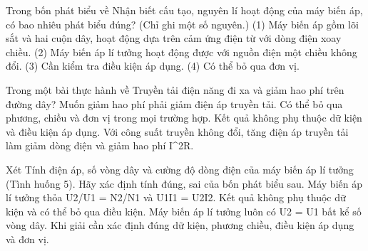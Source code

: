 \begin{ex}
Trong bốn phát biểu về Nhận biết cấu tạo, nguyên lí hoạt động của máy biến áp, có bao nhiêu phát biểu đúng? (Chỉ ghi một số nguyên.) (1) Máy biến áp gồm lõi sắt và hai cuộn dây, hoạt động dựa trên cảm ứng điện từ với dòng điện xoay chiều. (2) Máy biến áp lí tưởng hoạt động được với nguồn điện một chiều không đổi. (3) Cần kiểm tra điều kiện áp dụng. (4) Có thể bỏ qua đơn vị.
\end{ex}

\begin{ex}
Trong một bài thực hành về Truyền tải điện năng đi xa và giảm hao phí trên đường dây?
\choice
{Muốn giảm hao phí phải giảm điện áp truyền tải.}
{Có thể bỏ qua phương, chiều và đơn vị trong mọi trường hợp.}
{Kết quả không phụ thuộc dữ kiện và điều kiện áp dụng.}
{\True Với công suất truyền không đổi, tăng điện áp truyền tải làm giảm dòng điện và giảm hao phí I^2R.}
\end{ex}

\begin{ex}
Xét Tính điện áp, số vòng dây và cường độ dòng điện của máy biến áp lí tưởng (Tình huống 5). Hãy xác định tính đúng, sai của bốn phát biểu sau.
\choiceTF
{\True Máy biến áp lí tưởng thỏa U2/U1 = N2/N1 và U1I1 = U2I2.}
{Kết quả không phụ thuộc dữ kiện và có thể bỏ qua điều kiện.}
{Máy biến áp lí tưởng luôn có U2 = U1 bất kể số vòng dây.}
{\True Khi giải cần xác định đúng dữ kiện, phương chiều, điều kiện áp dụng và đơn vị.}
\end{ex}

